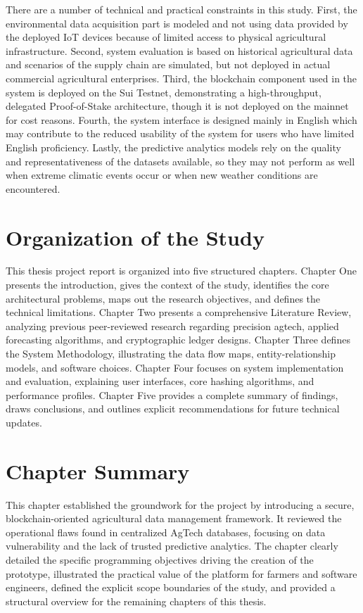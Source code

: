 There are a number of technical and practical constraints in this study. First, the environmental data acquisition part is modeled and not using data provided by the deployed IoT devices because of limited access to physical agricultural infrastructure. Second, system evaluation is based on historical agricultural data and scenarios of the supply chain are simulated, but not deployed in actual commercial agricultural enterprises. Third, the blockchain component used in the system is deployed on the Sui Testnet, demonstrating a high-throughput, delegated Proof-of-Stake architecture, though it is not deployed on the mainnet for cost reasons. Fourth, the system interface is designed mainly in English which may contribute to the reduced usability of the system for users who have limited English proficiency.
Lastly, the predictive analytics models rely on the quality and representativeness of the datasets available, so they may not perform as well when extreme climatic events occur or when new weather conditions are encountered.

\section{Organization of the Study}

This thesis project report is organized into five structured chapters. Chapter One presents the introduction, gives the context of the study, identifies the core architectural problems, maps out the research objectives, and defines the technical limitations. Chapter Two presents a comprehensive Literature Review, analyzing previous peer-reviewed research regarding precision agtech, applied forecasting algorithms, and cryptographic ledger designs. Chapter Three defines the System Methodology, illustrating the data flow maps, entity-relationship models, and software choices. Chapter Four focuses on system implementation and evaluation, explaining user interfaces, core hashing algorithms, and performance profiles. Chapter Five provides a complete summary of findings, draws conclusions, and outlines explicit recommendations for future technical updates.

\section{Chapter Summary}

This chapter established the groundwork for the project by introducing a secure, blockchain-oriented agricultural data management framework. It reviewed the operational flaws found in centralized AgTech databases, focusing on data vulnerability and the lack of trusted predictive analytics. The chapter clearly detailed the specific programming objectives driving the creation of the prototype, illustrated the practical value of the platform for farmers and software engineers, defined the explicit scope boundaries of the study, and provided a structural overview for the remaining chapters of this thesis.
